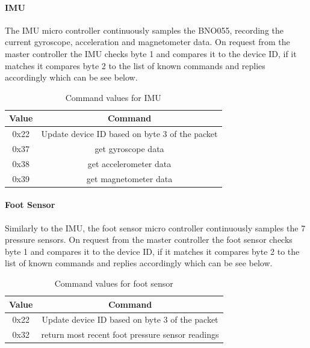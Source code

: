         \paragraph{IMU}
            The IMU micro controller continuously samples the BNO055, recording the current gyroscope, acceleration and magnetometer data. On request from the master controller the IMU checks byte 1 and compares it to the device ID, if it matches it compares byte 2 to the list of known commands and replies accordingly which can be see below.
            \begin{table}[H]
                \centering
                \begin{tabular}{|c|c|}
                \hline
                    Value & Command \\
                    \hline
                    0x22 & Update device ID based on byte 3 of the packet\\
                    0x37 & get gyroscope data\\
                    0x38 & get accelerometer data\\
                    0x39 & get magnetometer data\\
                    \hline
                    \end{tabular}
                \caption{Command values for IMU}
                \label{tab:IMUCommandValues}
            \end{table}

        \paragraph{Foot Sensor}
            Similarly to the IMU, the foot sensor micro controller continuously samples the 7 pressure sensors. On request from the master controller the foot sensor checks byte 1 and compares it to the device ID, if it matches it compares byte 2 to the list of known commands and replies accordingly which can be see below.
            \begin{table}[H]
                \centering
                \begin{tabular}{|c|c|}
                \hline
                    Value & Command \\
                    \hline
                    0x22 & Update device ID based on byte 3 of the packet\\
                    0x32 & return most recent foot pressure sensor readings\\
                    \hline
                    \end{tabular}
                \caption{Command values for foot sensor}
                \label{tab:FootSensorCommandValues}
            \end{table}

